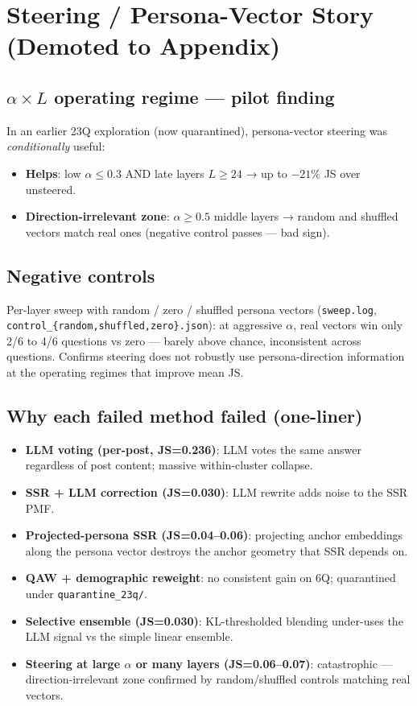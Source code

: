 \documentclass[10pt,a4paper]{article}
\begin{document}
\section{Steering / Persona-Vector Story (Demoted to Appendix)}

\subsection{$\alpha \times L$ operating regime — pilot finding}

In an earlier 23Q exploration (now quarantined), persona-vector steering was \emph{conditionally} useful:
\begin{itemize}[leftmargin=*,itemsep=0pt]
\item \textbf{Helps}: low $\alpha \le 0.3$ AND late layers $L \ge 24$ → up to $-21\%$ JS over unsteered.
\item \textbf{Direction-irrelevant zone}: $\alpha \ge 0.5$ middle layers → random and shuffled vectors match real ones (negative control passes — bad sign).
\end{itemize}

\subsection{Negative controls}

Per-layer sweep with random / zero / shuffled persona vectors (\texttt{sweep.log}, \texttt{control\_\{random,shuffled,zero\}.json}): at aggressive $\alpha$, real vectors win only 2/6 to 4/6 questions vs zero — barely above chance, inconsistent across questions. Confirms steering does not robustly use persona-direction information at the operating regimes that improve mean JS.

\subsection{Why each failed method failed (one-liner)}

\begin{itemize}[leftmargin=*,itemsep=0pt]
\item \textbf{LLM voting (per-post, JS=0.236)}: LLM votes the same answer regardless of post content; massive within-cluster collapse.
\item \textbf{SSR + LLM correction (JS=0.030)}: LLM rewrite adds noise to the SSR PMF.
\item \textbf{Projected-persona SSR (JS=0.04--0.06)}: projecting anchor embeddings along the persona vector destroys the anchor geometry that SSR depends on.
\item \textbf{QAW + demographic reweight}: no consistent gain on 6Q; quarantined under \texttt{quarantine\_23q/}.
\item \textbf{Selective ensemble (JS=0.030)}: KL-thresholded blending under-uses the LLM signal vs the simple linear ensemble.
\item \textbf{Steering at large $\alpha$ or many layers (JS=0.06--0.07)}: catastrophic — direction-irrelevant zone confirmed by random/shuffled controls matching real vectors.
\end{itemize}
\end{document}
